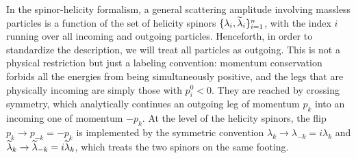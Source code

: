 In the spinor-helicity formalism, a general scattering amplitude involving massless particles is a function of the set of helicity spinors $\{\lambda_i,\widetilde{\lambda}_i\}_{i=1}^n$, with the index $i$ running over all incoming and outgoing particles.
Henceforth, in order to standardize the description, we will treat all particles as outgoing. 
This is not a physical restriction but just a labeling convention:
momentum conservation forbids all the energies from being simultaneously positive, and the legs that are physically incoming are simply those with $p_i^0<0$.
They are reached by crossing symmetry, which analytically continues an
outgoing leg of momentum $p_k$ into an incoming one of momentum $-p_k$.
At the level of the helicity spinors, the
flip $p_k \to p_{-k} = -p_k$ is implemented by the symmetric convention
$\lambda_k \to \lambda_{-k} = i\lambda_k$ and
$\widetilde{\lambda}_k \to \widetilde{\lambda}_{-k} = i\widetilde{\lambda}_k$, which treats the two spinors on the same footing.

